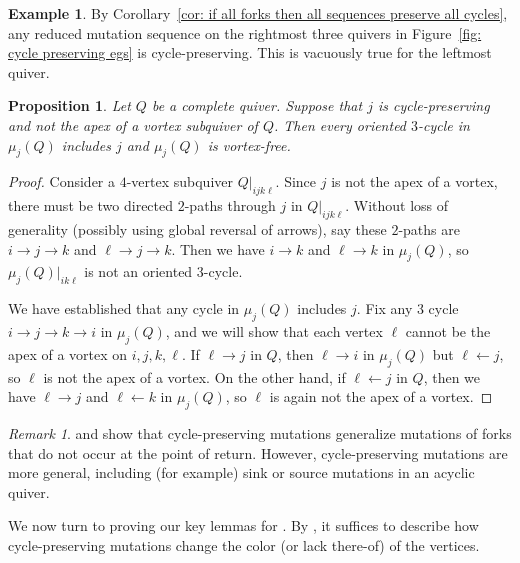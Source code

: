 \documentclass[12pt]{amsart}
\newtheorem{prop}[thm]{Proposition}
\theoremstyle{definition}
\newtheorem{exmp}[thm]{Example}
\theoremstyle{remark}
\newtheorem{rem}[thm]{Remark}
\numberwithin{equation}{section}
\begin{document}
\begin{exmp}
By Corollary~\ref{cor: if all forks then all sequences preserve all cycles}, any reduced mutation sequence on the rightmost three quivers in Figure~\ref{fig: cycle preserving egs} is cycle-preserving.
This is vacuously true for the leftmost quiver. 
\end{exmp}

\begin{prop}
\label{prop: cycle preserving is like a por}
Let $Q$ be a complete quiver. 
Suppose that $j$ is cycle-preserving and not the apex of a vortex subquiver of $Q$. Then every oriented $3$-cycle in $\mu_j(Q)$ includes $j$ and $\mu_j(Q)$ is vortex-free.
\end{prop}

\begin{proof}
Consider a $4$-vertex subquiver $Q|_{ijk\ell}$.  Since $j$ is not the apex of a vortex, there must be two directed $2$-paths through $j$ in $Q|_{ijk\ell}$.  Without loss of generality (possibly using global reversal of arrows), say these $2$-paths are $i \rightarrow j \rightarrow k$ and $\ell \rightarrow j \rightarrow k$.  Then we have $i \rightarrow k$ and $\ell \rightarrow k$ in $\mu_j(Q)$, so $\mu_j(Q)|_{ik\ell}$ is not an oriented $3$-cycle.  


We have established that any cycle in $\mu_j(Q)$ includes $j$.  Fix any $3$ cycle $i \rightarrow j \rightarrow k \rightarrow i$ in $\mu_j(Q)$, and we will show that each vertex $\ell$ cannot be the apex of a vortex on $i,j,k,\ell$.  If $\ell \rightarrow j$ in $Q$, then $\ell \rightarrow i$ in $\mu_j(Q)$ but $\ell \leftarrow j$, so $\ell$ is not the apex of a vortex.  On the other hand, if $\ell \leftarrow j$ in $Q$, then we have $\ell \rightarrow j$ and $\ell \leftarrow k$ in $\mu_j(Q)$, so $\ell$ is again not the apex of a vortex.  
\end{proof}

\begin{rem}
 and  show that cycle-preserving mutations generalize mutations of forks that do not occur at the point of return.
However, cycle-preserving mutations are more general, including (for example) sink or source mutations in an acyclic quiver. 
\end{rem}


We now turn to proving our key lemmas for .
By , it suffices to describe how cycle-preserving mutations change the color (or lack there-of) of the vertices. 
\end{document}
